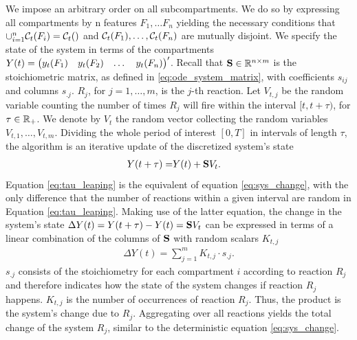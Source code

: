 We impose an arbitrary order on all subcompartments. We do so by expressing all compartments by n features $F_1, \dots F_n$ yielding the necessary conditions that $\cup_{i=1}^n \mathcal{C}_t(F_i) = \mathcal{C}_t()$ and $\mathcal{C}_t(F_1), \dots, \mathcal{C}_t(F_n)$ are mutually disjoint. We specify the state of the system in terms of the compartments $Y(t) = \begin{pmatrix} y_t(F_1) & y_t(F_2) & \dots & y_t(F_n)\end{pmatrix}'$. Recall that $\mathbf{S} \in \mathbb{R}^{n \times m}$ is the stoichiometric matrix, as defined in \eqref{eq:ode_system_matrix}, with coefficients $s_{ij}$ and columns $s_{.j}$. $R_j$, for $j=1, \dots, m$, is the $j$-th reaction. Let $V_{t,j}$ be the random variable counting the number of times $R_j$ will fire within the interval $[t, t + \tau)$, for $\tau \in \mathbb{R}_+$. We denote by $V_t$ the random vector collecting the random variables $V_{t,1}, \hdots, V_{t,m}$. Dividing the whole period of interest $[0, T]$ in intervals of length $\tau$, the algorithm is an iterative update of the discretized system's state
\begin{align}
\label{eq:tau_leaping}
Y(t + \tau) =& Y(t) + \mathbf{S} V_t.
\end{align}
Equation \eqref{eq:tau_leaping} is the equivalent of equation \eqref{eq:sys_change}, with the only difference that the number of reactions within a given interval are random in Equation \eqref{eq:tau_leaping}. Making use of the latter equation, the change in the system's state $\Delta Y(t) = Y(t + \tau) - Y(t)= \mathbf{S} V_t$ can be expressed in terms of a linear combination of the columns of $\mathbf{S}$ with random scalars $K_{t,j}$
\begin{align}
\Delta Y(t) = \sum_{j=1}^m K_{t,j} \cdot s_{.j}.
\end{align}
$s_{.j}$ consists of the stoichiometry for each compartment $i$ according to reaction $R_j$ and therefore indicates how the state of the system changes if reaction $R_j$ happens. $K_{t,j}$ is the number of occurrences of reaction $R_j$. Thus, the product is the system's change due to $R_j$. Aggregating over all reactions yields the total change of the system $R_j$, similar to the deterministic equation \eqref{eq:sys_change}.\\  

